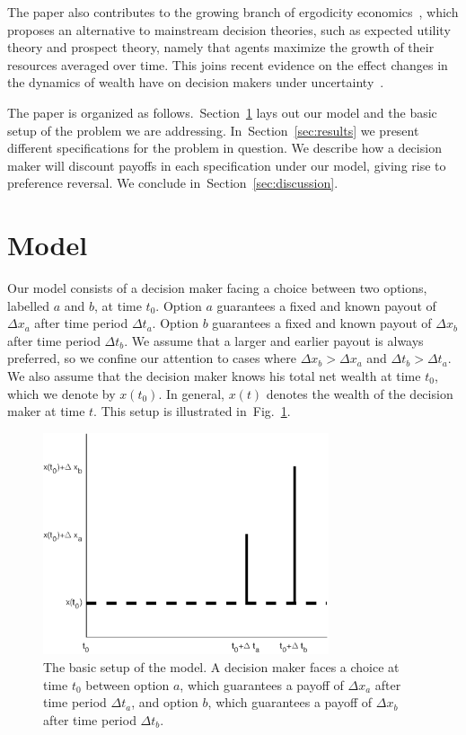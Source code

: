 \documentclass[11pt]{article}
\newcommand{\Sref}[1]{Section~\ref{sec:#1}}
\newcommand{\flabel}[1]{\label{fig:#1}}
\newcommand{\fref}[1]{Fig.~\ref{fig:#1}}
\newcommand{\Dt}{\Delta t}
\newcommand{\Dx}{\Delta x}
\numberwithin{equation}{section}
\begin{document}
The paper also contributes to the growing branch of ergodicity economics~\citep{peters2016evaluating,berman2016far,peters2018time}, which proposes an alternative to mainstream decision theories, such as expected utility theory and prospect theory, namely that agents maximize the growth of their resources averaged over time. This joins recent evidence on the effect changes in the dynamics of wealth have on decision makers under uncertainty~\citep{hulme2019unpublished}.

The paper is organized as follows.~\Sref{model} lays out our model and the basic setup of the problem we are addressing. In~\Sref{results} we present different specifications for the problem in question. We describe how a decision maker will discount payoffs in each specification under our model, giving rise to preference reversal. We conclude in~\Sref{discussion}.

\section{Model}\label{sec:model}

Our model consists of a decision maker facing a choice between two options, labelled $a$ and $b$, at time $t_0$. Option $a$ guarantees a fixed and known payout of $\Dx_a$ after time period $\Dt_a$. Option $b$ guarantees a fixed and known payout of $\Dx_b$ after time period $\Dt_b$. We assume that a larger and earlier payout is always preferred, so we confine our attention to cases where $\Dx_b > \Dx_a$ and $\Dt_b > \Dt_a$. We also assume that the decision maker knows his total net wealth at time $t_0$, which we denote by $x\left(t_0\right)$. In general, $x\left(t\right)$ denotes the wealth of the decision maker at time $t$. This setup is illustrated in~\fref{basicsetup}.

\begin{figure}[!htb]
\centering
\includegraphics[width=0.75\textwidth]{./figures/basicsetup.eps}
\caption{The basic setup of the model. A decision maker faces a choice at time $t_0$ between option $a$, which guarantees a payoff of $\Dx_a$ after time period $\Dt_a$, and option $b$, which guarantees a payoff of $\Dx_b$ after time period $\Dt_b$.}
\flabel{basicsetup}
\end{figure}
\end{document}
